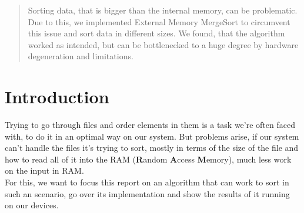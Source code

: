 \documentclass[twocolumn]{article}
\begin{document}


\begin{abstract}
    Sorting data, that is bigger than the internal memory, can be problematic. Due to this, we implemented External Memory MergeSort to circumvent this issue and sort data in different sizes. We found, that the algorithm worked as intended, but can be bottlenecked to a huge degree by hardware degeneration and limitations.
\end{abstract}


\section{Introduction}
Trying to go through files and order elements in them is a task we're often faced with, to do it in an optimal way on our system. But problems arise, if our system can't handle the files it's trying to sort, mostly in terms of the size of the file and how to read all of it into the RAM (\textbf{R}andom \textbf{A}ccess \textbf{M}emory), much less work on the input in RAM.\\
For this, we want to focus this report on an algorithm that can work to sort in such an scenario, go over its implementation and show the results of it running on our devices.
\end{document}
